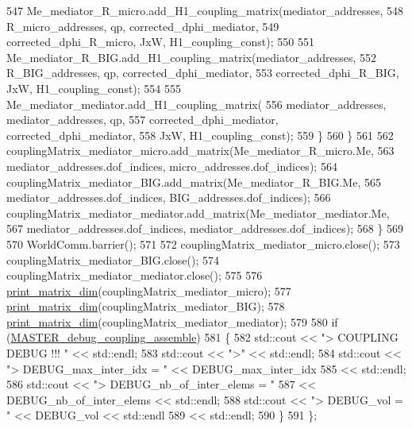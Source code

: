 \begin{DoxyCode}
547                     Me\_mediator\_R\_micro.add\_H1\_coupling\_matrix(mediator\_addresses,
548                             R\_micro\_addresses, qp, corrected\_dphi\_mediator,
549                             corrected\_dphi\_R\_micro, JxW, H1\_coupling\_const);
550 
551                     Me\_mediator\_R\_BIG.add\_H1\_coupling\_matrix(mediator\_addresses,
552                             R\_BIG\_addresses, qp, corrected\_dphi\_mediator,
553                             corrected\_dphi\_R\_BIG, JxW, H1\_coupling\_const);
554 
555                     Me\_mediator\_mediator.add\_H1\_coupling\_matrix(
556                             mediator\_addresses, mediator\_addresses, qp,
557                             corrected\_dphi\_mediator, corrected\_dphi\_mediator,
558                             JxW, H1\_coupling\_const);
559                 \}
560             \}
561 
562             couplingMatrix\_mediator\_micro.add\_matrix(Me\_mediator\_R\_micro.Me,
563                     mediator\_addresses.dof\_indices, micro\_addresses.dof\_indices);
564             couplingMatrix\_mediator\_BIG.add\_matrix(Me\_mediator\_R\_BIG.Me,
565                     mediator\_addresses.dof\_indices, BIG\_addresses.dof\_indices);
566             couplingMatrix\_mediator\_mediator.add\_matrix(Me\_mediator\_mediator.Me,
567                     mediator\_addresses.dof\_indices, mediator\_addresses.dof\_indices);
568         \}
569 
570         WorldComm.barrier();
571 
572         couplingMatrix\_mediator\_micro.close();
573         couplingMatrix\_mediator\_BIG.close();
574         couplingMatrix\_mediator\_mediator.close();
575 
576         \hyperlink{namespacecarl_a8ab4aecb3273c14a472f00cc892f95a0}{print\_matrix\_dim}(couplingMatrix\_mediator\_micro);
577         \hyperlink{namespacecarl_a8ab4aecb3273c14a472f00cc892f95a0}{print\_matrix\_dim}(couplingMatrix\_mediator\_BIG);
578         \hyperlink{namespacecarl_a8ab4aecb3273c14a472f00cc892f95a0}{print\_matrix\_dim}(couplingMatrix\_mediator\_mediator);
579 
580         \textcolor{keywordflow}{if} (\hyperlink{assemble__coupling_8h_a3f527e02b01bca9936969241fc053a33}{MASTER\_debug\_coupling\_assemble})
581         \{
582             std::cout << \textcolor{stringliteral}{"> COUPLING DEBUG !!! "} << std::endl;
583             std::cout << \textcolor{stringliteral}{">"} << std::endl;
584             std::cout << \textcolor{stringliteral}{">    DEBUG\_max\_inter\_idx     = "} << DEBUG\_max\_inter\_idx
585                     << std::endl;
586             std::cout << \textcolor{stringliteral}{">    DEBUG\_nb\_of\_inter\_elems = "}
587                     << DEBUG\_nb\_of\_inter\_elems << std::endl;
588             std::cout << \textcolor{stringliteral}{">    DEBUG\_vol               = "} << DEBUG\_vol << std::endl
589                     << std::endl;
590         \}
591     \};
\end{DoxyCode}
